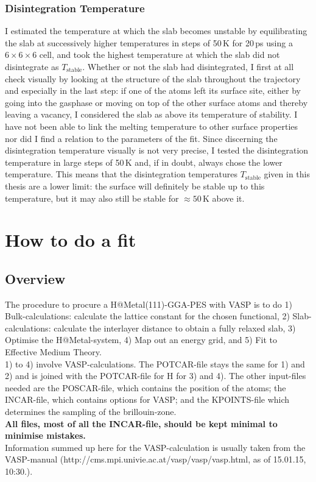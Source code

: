 \documentclass[twoside, 11pt, titlepage, captions=nooneline, a4paper, headsepline]{scrbook}%
\newcommand{\9}{\mathrm}
\newcommand{\0}{\,\mathrm}
\begin{document}
\subsection{Disintegration Temperature}
I estimated the temperature at which the slab becomes unstable by equilibrating the slab at successively higher temperatures in steps of 50\,K for 20\,ps using a $6\times6\times6$ cell, and took the highest temperature at which the slab did not disintegrate as $T_\mathrm{stable}$. Whether or not the slab had disintegrated, I first at all check visually by looking at the structure of the slab throughout the trajectory and especially in the last step: if one of the atoms left its surface site, either by going into the gasphase or moving on top of the other surface atoms and thereby leaving a vacancy, I considered the slab as above its temperature of stability. I have not been able to link the melting temperature to other surface properties nor did I find a relation to the parameters of the fit. Since discerning the disintegration temperature visually is not very precise, I tested the disintegration temperature in large steps of 50\,K and, if in doubt, always chose the lower temperature. This means that the disintegration temperatures $T_\mathrm{stable}$ given in this thesis are a lower limit: the surface will definitely be stable up to this temperature, but it may also still be stable for $\approx 50$\,K above it. 



\chapter{How to do a fit}
\section*{Overview}
The procedure to procure a H@Metal(111)-GGA-PES with VASP is to do 1) Bulk-calculations: calculate the lattice constant for the chosen functional, 2) Slab-calculations: calculate the interlayer distance to obtain a fully relaxed slab, 3) Optimise the H@Metal-system, 4) Map out an energy grid, and 5) Fit to Effective Medium Theory.\\
1) to 4) involve VASP-calculations. The POTCAR-file stays the same for 1) and 2) and is joined with the POTCAR-file for H for 3) and 4). The other input-files needed are the POSCAR-file, which contains the position of the atoms; the INCAR-file, which contains options for VASP; and the KPOINTS-file which determines the sampling of the brillouin-zone.\\
\textbf{All files, most of all the INCAR-file, should be kept minimal to minimise mistakes.}\\
Information summed up here for the VASP-calculation is usually taken from the VASP-manual (http://cms.mpi.univie.ac.at/vasp/vasp/vasp.html, as of 15.01.15, 10:30.).
\end{document}
